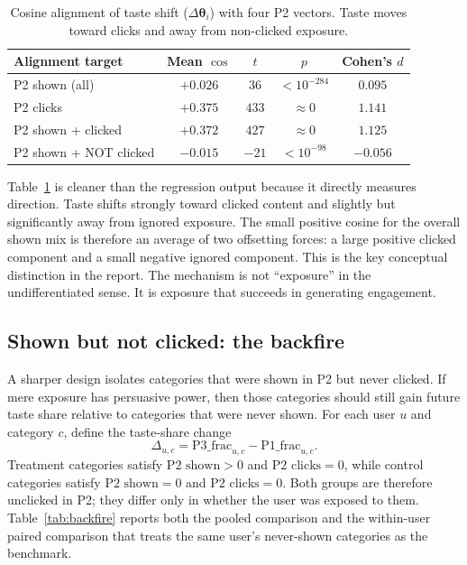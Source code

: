 \documentclass[11pt]{article}
\begin{document}
\begin{table}[ht]
\centering
\caption{Cosine alignment of taste shift ($\Delta\boldsymbol{\theta}_i$) with four P2 vectors. Taste moves toward clicks and away from non-clicked exposure.}
\label{tab:cosine_alignment}
\begin{tabular}{lcccc}
\toprule
Alignment target & Mean $\cos$ & $t$ & $p$ & Cohen's $d$ \\
\midrule
P2 shown (all) & $+0.026$ & $36$ & $< 10^{-284}$ & $0.095$ \\
P2 clicks & $+0.375$ & $433$ & $\approx 0$ & $1.141$ \\
P2 shown + clicked & $+0.372$ & $427$ & $\approx 0$ & $1.125$ \\
P2 shown + NOT clicked & $\mathbf{-0.015}$ & $-21$ & $< 10^{-98}$ & $-0.056$ \\
\bottomrule
\end{tabular}
\end{table}
\FloatBarrier

Table~\ref{tab:cosine_alignment} is cleaner than the regression output because it directly measures direction. Taste shifts strongly toward clicked content and slightly but significantly away from ignored exposure. The small positive cosine for the overall shown mix is therefore an average of two offsetting forces: a large positive clicked component and a small negative ignored component. This is the key conceptual distinction in the report. The mechanism is not ``exposure'' in the undifferentiated sense. It is exposure that succeeds in generating engagement.

\subsection{Shown but not clicked: the backfire}
\label{sec:shown_not_clicked}

A sharper design isolates categories that were shown in P2 but never clicked. If mere exposure has persuasive power, then those categories should still gain future taste share relative to categories that were never shown. For each user $u$ and category $c$, define the taste-share change
\[
\Delta_{u,c} = \text{P3\_frac}_{u,c} - \text{P1\_frac}_{u,c}.
\]
Treatment categories satisfy $\text{P2 shown}>0$ and $\text{P2 clicks}=0$, while control categories satisfy $\text{P2 shown}=0$ and $\text{P2 clicks}=0$. Both groups are therefore unclicked in P2; they differ only in whether the user was exposed to them. Table~\ref{tab:backfire} reports both the pooled comparison and the within-user paired comparison that treats the same user's never-shown categories as the benchmark.
\end{document}
